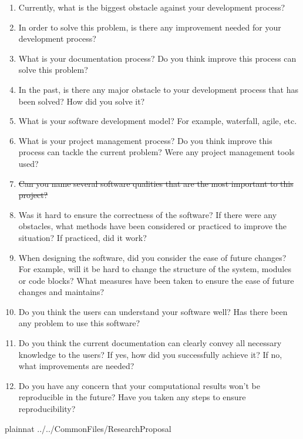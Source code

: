 \documentclass[12pt]{article}
\begin{document}
\begin{enumerate}
\item Currently, what is the biggest obstacle against your development process?
\item In order to solve this problem, is there any improvement needed for your
development process?
\item What is your documentation process? Do you think improve this process can
solve this problem?
\item In the past, is there any major obstacle to your development process that
has been solved? How did you solve it?
\item What is your software development model? For example, waterfall, agile, etc.
\item What is your project management process? Do you think improve this process
can tackle the current problem? Were any project management tools used?
\item \sout{Can you name several software qualities that are the most important to
this project?}
\item Was it hard to ensure the correctness of the software? If there were any
 obstacles, what methods have been considered or practiced to improve the situation?
  If practiced, did it work?
\item When designing the software, did you consider the ease of future changes?
 For example, will it be hard to change the structure of the system, modules or code
  blocks? What measures have been taken to ensure the ease of future changes
   and maintains?
\item Do you think the users can understand your software well? Has there been
any problem to use this software?
\item Do you think the current documentation can clearly convey all necessary
knowledge to the users? If yes, how did you successfully achieve it? If no, what
improvements are needed?
\item Do you have any concern that your computational results won't be
reproducible in the future? Have you taken any steps to ensure reproducibility?
\end{enumerate}

\newpage

 {plainnat}
 {../../CommonFiles/ResearchProposal}
\end{document}
